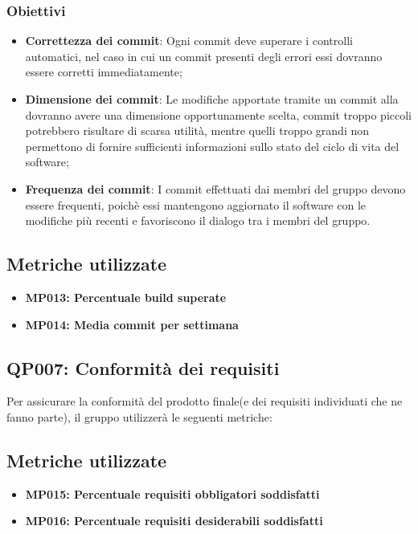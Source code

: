 \subsubsection{Obiettivi}
\begin{itemize}
	\item \textbf{Correttezza dei commit}: Ogni commit deve superare i controlli automatici, nel caso in cui un commit presenti degli errori  essi dovranno essere corretti immediatamente;
	\item \textbf{Dimensione dei commit}: Le modifiche apportate tramite un commit alla  dovranno avere una dimensione opportunamente scelta, commit troppo piccoli potrebbero risultare di scarsa utilità, mentre quelli troppo grandi non permettono di fornire sufficienti informazioni sullo stato del ciclo di vita del software;
	\item  \textbf{Frequenza dei commit}: I commit effettuati dai membri del gruppo devono essere frequenti, poichè essi mantengono aggiornato il software con le modifiche più recenti e favoriscono il dialogo tra i membri del gruppo.
	
\end{itemize}
\subsection{Metriche utilizzate}
\begin{itemize}
	\item \textbf{MP013: Percentuale build superate}
	\item \textbf{MP014: Media commit per settimana}
\end{itemize}

\subsection{QP007: Conformità dei requisiti}
Per assicurare la conformità del prodotto finale(e dei requisiti individuati che ne fanno parte), il gruppo utilizzerà le seguenti metriche:

\subsection{Metriche utilizzate}
\begin{itemize}
	\item \textbf{MP015: Percentuale requisiti obbligatori soddisfatti}
	\item \textbf{MP016: Percentuale requisiti desiderabili soddisfatti}
\end{itemize}

